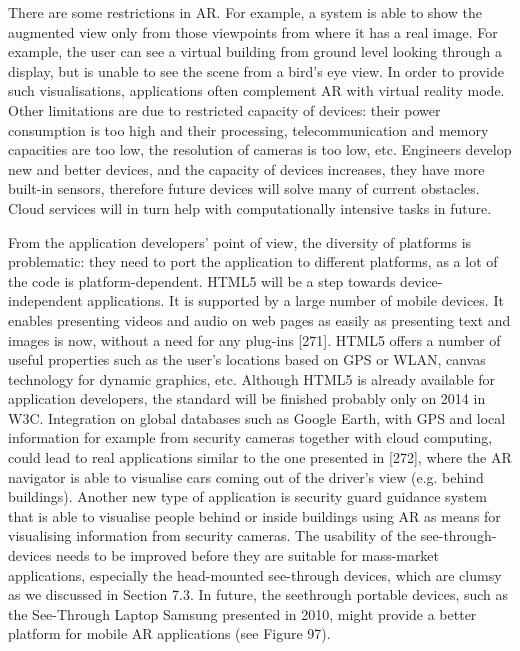 There are some restrictions in AR. For example, a system is able to show the augmented view only from those viewpoints from where it has a real image. For example, the user can see a virtual building from ground level looking through a display, but is unable to see the scene from a bird's eye view. In order to provide such visualisations, applications often complement AR with virtual reality mode. Other limitations are due to restricted capacity of devices: their power consumption is too high and their processing, telecommunication and memory capacities are too low, the resolution of cameras is too low, etc. Engineers develop new and better devices, and the capacity of devices increases, they have more built-in sensors, therefore future devices will solve many of current obstacles. Cloud services will in turn help with computationally intensive tasks in future.

From the application developers’ point of view, the diversity of platforms is problematic: they need to port the application to different platforms, as a lot of the code is platform-dependent. HTML5 will be a step towards device-independent applications. It is supported by a large number of mobile devices. It enables presenting videos and audio on web pages as easily as presenting text and images is now, without a need for any plug-ins [271]. HTML5 offers a number of useful properties such as the user’s locations based on GPS or WLAN, canvas technology for dynamic graphics, etc. Although HTML5 is already available for application developers, the standard will be finished probably only on 2014 in W3C. Integration on global databases such as Google Earth, with GPS and local information for example from security cameras together with cloud computing, could lead to real applications similar to the one presented in [272], where the AR navigator is able to visualise cars coming out of the driver’s view (e.g. behind buildings). Another new type of application is security guard guidance system that is able to visualise people behind or inside buildings using AR as means for visualising information from security cameras. The usability of the see-through-devices needs to be improved before they are suitable for mass-market applications, especially the head-mounted see-through devices, which are clumsy as we discussed in Section 7.3. In future, the seethrough portable devices, such as the See-Through Laptop Samsung presented in 2010, might provide a better platform for mobile AR applications (see Figure 97).


